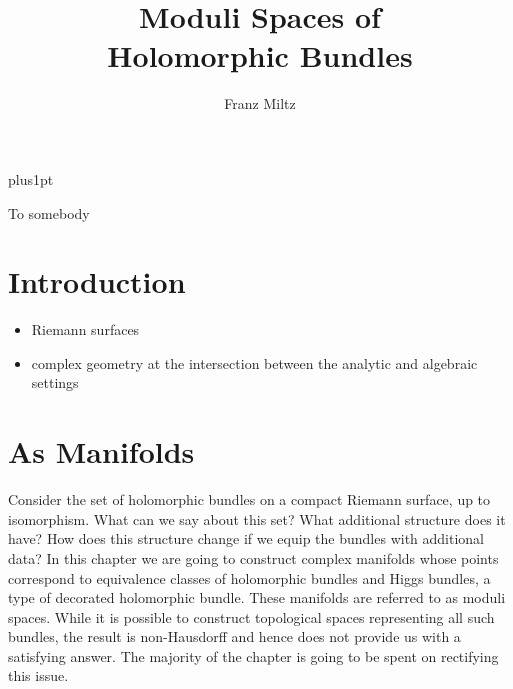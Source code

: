 \documentclass[12pt]{ociamthesis}  %
\title{Moduli Spaces of\\[1ex]Holomorphic Bundles}   %
\author{Franz Miltz}             %
\begin{document}
\baselineskip=18pt plus1pt

\setcounter{secnumdepth}{3}
\setcounter{tocdepth}{3}


\maketitle                  %
\begin{dedication}
  To somebody
\end{dedication}
\begin{acknowledgements}

\end{acknowledgements}
\begin{abstract}

\end{abstract}

\begin{romanpages}          %
  \tableofcontents            %
\end{romanpages}            %

\chapter{Introduction}

\begin{itemize}
  \item Riemann surfaces
  \item complex geometry at the intersection between the analytic and algebraic settings
\end{itemize}

\chapter{As Manifolds}

Consider the set of holomorphic bundles on a compact Riemann surface,
up to isomorphism. What can we say about this set? What additional
structure does it have? How does this structure change if we equip
the bundles with additional data?
In this chapter we are going to construct complex manifolds whose
points correspond to equivalence classes of holomorphic bundles
and Higgs bundles, a type of decorated holomorphic bundle. These
manifolds are referred to as moduli spaces. While it
is possible to construct topological spaces representing all such bundles,
the result is non-Hausdorff and hence does not provide us with a
satisfying answer. The majority of the chapter is going to be spent
on rectifying this issue.
\end{document}
